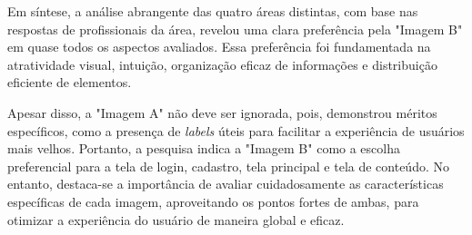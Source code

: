 Em síntese, a análise abrangente das quatro áreas distintas, com base nas respostas de profissionais da área, revelou uma clara preferência pela "Imagem B" em quase todos os aspectos avaliados. Essa preferência foi fundamentada na atratividade visual, intuição, organização eficaz de informações e distribuição eficiente de elementos.

Apesar disso, a "Imagem A" não deve ser ignorada, pois, demonstrou méritos específicos, como a presença de \textit{labels} úteis para facilitar a experiência de usuários mais velhos. Portanto, a pesquisa indica a "Imagem B" como a escolha preferencial para a tela de login, cadastro, tela principal e tela de conteúdo. No entanto, destaca-se a importância de avaliar cuidadosamente as características específicas de cada imagem, aproveitando os pontos fortes de ambas, para otimizar a experiência do usuário de maneira global e eficaz.
